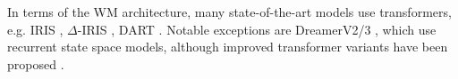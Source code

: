  
In terms of the WM architecture, many state-of-the-art models use transformers, e.g. 
IRIS \citep{micheli2022transformers},
$\Delta$-IRIS \citep{micheli2024efficient},
DART \citep{agarwal2024learning}.
Notable exceptions are DreamerV2/3  \citep{hafner2020mastering,hafner2023mastering}, which use recurrent state space models,
although improved transformer variants have been proposed 
\citep{robine2023transformer,zhang2024storm,chen2202transdreamer}.